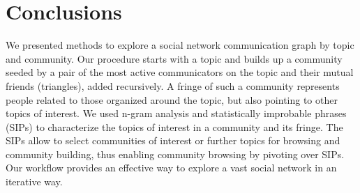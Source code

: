 \section{Conclusions}

We presented methods to explore a social network communication graph by topic and community.  Our procedure starts with a topic and builds up a community seeded by a pair of the most active communicators on the topic and their mutual friends (triangles), added recursively.  A fringe of such a community represents people related to those organized around the topic, but also pointing to other topics of interest.  We used n-gram analysis and statistically improbable phrases (SIPs) to characterize the topics of interest in a community and its fringe.  The SIPs allow to select communities of interest or further topics for browsing and community building, thus enabling community browsing by pivoting over SIPs.  Our workflow provides an effective way to explore a vast social network in an iterative way.	 

